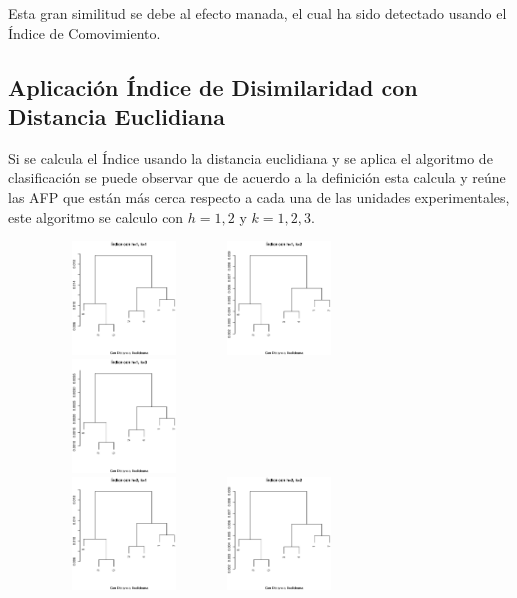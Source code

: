 Esta gran similitud se debe al efecto manada, el cual ha sido detectado usando el \'Indice de Comovimiento.

\subsection{Aplicaci\'on \'Indice de Disimilaridad con Distancia Euclidiana}

Si se calcula el \'Indice usando la distancia euclidiana y se aplica el algoritmo de clasificaci\'on se puede observar que de acuerdo a la definici\'on esta calcula y re\'une las AFP que est\'an m\'as cerca respecto a cada una de las unidades experimentales, este algoritmo se calculo con $h=1,2$ y $k=1,2,3$.

\begin{figure}[!htp]
\begin{center}
\centering
  \includegraphics[height=3cm, width=4cm]{i_euc_h_1_k_1.eps}
  \includegraphics[height=3cm, width=4cm]{i_euc_h_1_k_2.eps}
  \includegraphics[height=3cm, width=4cm]{i_euc_h_1_k_3.eps}\\
  \includegraphics[height=3cm, width=4cm]{i_euc_h_2_k_1.eps}
  \includegraphics[height=3cm, width=4cm]{i_euc_h_2_k_2.eps}

\end{center}
\end{figure}

